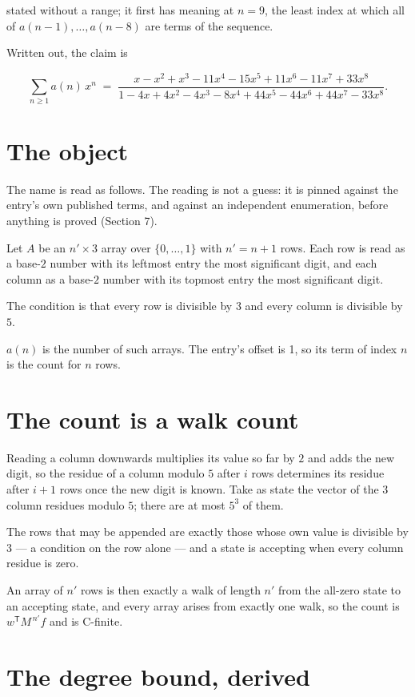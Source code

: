 \documentclass[11pt]{article}
\theoremstyle{definition}
\begin{document}
stated without a range; it first has meaning at $n = 9$, the least index at which all of $a(n-1),\dots,a(n-8)$ are terms of the sequence.

Written out, the claim is

\[\sum_{n \ge 1} a(n)\,x^n \;=\; \frac{x - x^{2} + x^{3} - 11x^{4} - 15x^{5} + 11x^{6} - 11x^{7} + 33x^{8}}{1 - 4x + 4x^{2} - 4x^{3} - 8x^{4} + 44x^{5} - 44x^{6} + 44x^{7} - 33x^{8}}.\]

\section{The object}

The name is read as follows. The reading is not a guess: it is pinned against the entry's own published terms, and against an independent enumeration, before anything is proved (Section 7).

Let $A$ be an $n' \times 3$ array over $\{0,\dots,1\}$ with $n' = n + 1$ rows. Each row is read as a base-$2$ number with its leftmost entry the most significant digit, and each column as a base-$2$ number with its topmost entry the most significant digit.

The condition is that every row is divisible by $3$ and every column is divisible by $5$.

$a(n)$ is the number of such arrays. The entry's offset is 1, so its term of index $n$ is the count for $n$ rows.

\section{The count is a walk count}

Reading a column downwards multiplies its value so far by $2$ and adds the new digit, so the residue of a column modulo $5$ after $i$ rows determines its residue after $i+1$ rows once the new digit is known. Take as state the vector of the $3$ column residues modulo $5$; there are at most $5^{3}$ of them.

The rows that may be appended are exactly those whose own value is divisible by $3$ --- a condition on the row alone --- and a state is accepting when every column residue is zero.

An array of $n'$ rows is then exactly a walk of length $n'$ from the all-zero state to an accepting state, and every array arises from exactly one walk, so the count is $w^{\mathsf T}M^{\,n'}f$ and is C-finite.

\section{The degree bound, derived}
\end{document}
